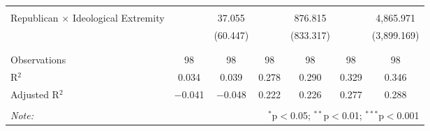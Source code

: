 \begin{tabular}{@{\extracolsep{5pt}}lcccccc}
  & & & & & & \\ 
 Republican $\times$ Ideological Extremity &  & 37.055 &  & 876.815 &  & 4,865.971 \\ 
  &  & (60.447) &  & (833.317) &  & (3,899.169) \\ 
  & & & & & & \\ 
\hline \\[-1.8ex] 
Observations & 98 & 98 & 98 & 98 & 98 & 98 \\ 
R$^{2}$ & 0.034 & 0.039 & 0.278 & 0.290 & 0.329 & 0.346 \\ 
Adjusted R$^{2}$ & $-$0.041 & $-$0.048 & 0.222 & 0.226 & 0.277 & 0.288 \\ 
\hline 
\hline \\[-1.8ex] 
\textit{Note:}  & \multicolumn{6}{r}{$^{*}$p$<$0.05; $^{**}$p$<$0.01; $^{***}$p$<$0.001} \\ 
\end{tabular} 
